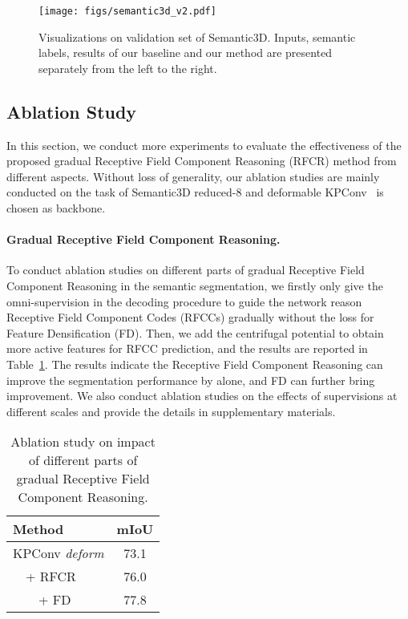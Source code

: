 \documentclass[final]{cvpr}
\begin{document}
\begin{figure}[ht]
    \centering
    \texttt{[image: figs/semantic3d\_v2.pdf]}
    \caption{Visualizations on validation set of Semantic3D. Inputs, semantic labels, results of our baseline and our method are presented separately from the left to the right.}
    \label{fig:semantic3d}
\end{figure}

\subsection{Ablation Study}
\label{subsec:ablation}
In this section, we conduct more experiments to evaluate the effectiveness of the proposed gradual Receptive Field Component Reasoning (RFCR) method from different aspects. Without loss of generality, our ablation studies are mainly conducted on the task of Semantic3D reduced-8 and deformable KPConv~\cite{thomas2019kpconv} is chosen as backbone.

\paragraph{Gradual Receptive Field Component Reasoning.}
To conduct ablation studies on different parts of gradual Receptive Field Component Reasoning in the semantic segmentation, we firstly only give the omni-supervision in the decoding procedure to guide the network reason Receptive Field Component Codes (RFCCs) gradually without the loss for Feature Densification (FD). Then, we add the centrifugal potential to obtain more active features for RFCC prediction, and the results are reported in Table~\ref{tab:ablation}. The results indicate the Receptive Field Component Reasoning can improve the segmentation performance by  alone, and FD can further bring  improvement. We also conduct ablation studies on the effects of supervisions at different scales and provide the details in supplementary materials.

\begin{table}
\centering
\begin{tabular}{lc} 
\toprule
Method  & mIoU \\
\midrule
KPConv \textit{deform} & 73.1\\
\ \ + RFCR& 76.0\\
\ \ \ \ + FD& 77.8 \\
\bottomrule
\end{tabular}
\caption{Ablation study on impact of different parts of gradual Receptive Field Component Reasoning.}
\label{tab:ablation}
\end{table}
\end{document}
